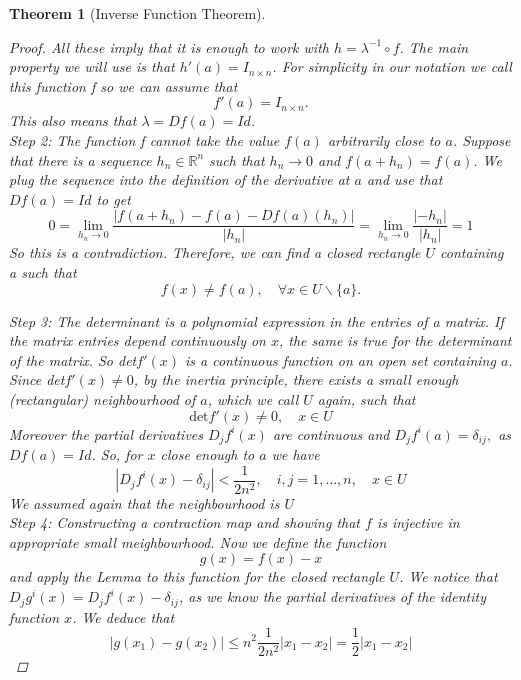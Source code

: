 \documentclass[11pt]{article}
\def\RR{\mathbb{R}}
\newtheorem{theorem}{Theorem}[section]
\begin{document}
\begin{theorem}[Inverse Function Theorem]
\begin{proof}
All these imply that it is enough to work with $h = \lambda ^{-1} \circ f$. The main property we will
use is that $h'(a)=I_{n \times n}$. For simplicity in our notation we call this function f so we can
assume that
\[f'(a) = I_{n \times n}. \]
This also means that $\lambda = Df(a) = Id$.\\
\textit{Step 2:}
The function f cannot take the value $f(a)$ arbitrarily close to $a$. Suppose that there is a sequence $h_{n} \in \RR^n$ such that $ h_{n} \rightarrow 0$ and $f(a + h_{n}) = f(a)$. We plug the sequence into the definition of the derivative at $a$ and use that $Df(a) = Id$ to get
\[ 0 = \lim_{h_{n} \rightarrow 0}\frac{|f(a + h_{n}) - f(a) - Df(a)(h_{n})|}{|h_{n}|} = \lim_{h_{n} \rightarrow 0}\frac{|-h_{n}|}{|h_{n}|} = 1\]
So this is a contradiction. Therefore, we can find a closed rectangle $U$ containing a such
that
\[f(x) \neq f(a), \quad \forall x \in U\backslash \{a\}. \]


\textit{Step 3:} The determinant is a polynomial expression in the entries of a matrix. If the matrix entries depend continuously on $x$, the same is true for the determinant of the matrix. So det$f'(x)$ is a continuous function on an open set containing $a$. Since det$f'(x) \neq 0$, by the inertia principle, there exists a small enough (rectangular) neighbourhood of $a$, which
we call $U$ again, such that
\begin{equation}
 \text{det}f'(x) \neq 0, \quad x \in U \end{equation} 
Moreover the partial derivatives $D_{j}f^{i}(x)$ are continuous and $D_{j}f^{i}(a) = \delta_{ij},$ as $Df(a) = Id$. So, for $x$ close enough to $a$ we have
\begin{equation}
|D_{j}f^{i}(x) - \delta_{ij}| < \frac{1}{2n^{2}}, \quad i,j = 1, \dots , n, \quad x \in U
\end{equation}
We assumed again that the neighbourhood is $U$\\
\textit{Step 4:}  Constructing a contraction map and showing that $f$ is injective in appropriate small meighbourhood. Now we define the function
\[ g(x) = f(x) - x\]
and apply the Lemma to this function for the closed rectangle $U$. We notice that $D_{j}g^{i}(x) =D_{j}f^{i}(x) - \delta_{ij}$, as we know the partial derivatives of the identity function $x$. We deduce that
\begin{equation}
|g(x_{1}) - g(x_{2})| \leq n^{2}\frac{1}{2n^2}|x_{1} - x_{2}| = \frac{1}{2}|x_{1} - x_{2}| \end{equation}


\end{proof}
\end{theorem}
\end{document}
